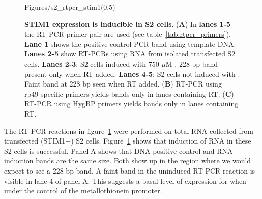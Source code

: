 \begin{figure}[ht!]
\begin{center}\vspace{-110pt}
	\begin{lpic}[clean]{Figures/s2_rtpcr_stim1(0.5)}
		
	\end{lpic}\vspace{100pt}
	\caption[STIM1 expression is inducible in \droso{} S2 cells]{{\bfseries STIM1 expression is inducible in \droso{} S2 cells}.
	({\bfseries A}) In {\bfseries lanes 1-5} the \stim{} RT-PCR primer pair are used (see table~\ref{tab:rtpcr_primers}).
	{\bfseries Lane 1} shows the positive control PCR band using \stim{} template DNA.
	{\bfseries Lanes 2-5} show RT-PCRs using RNA from isolated \stimivector{} transfected S2 cells. 
	{\bfseries Lanes 2-3}: S2 cells induced with 750 $\mu$M \cuso. 228 bp band present only when RT added.
	{\bfseries Lanes 4-5}: S2 cells not induced with \cuso. Faint band at 228 bp seen when RT added.
	({\bfseries B}) RT-PCR using rp49-specific primers yields bands only in lanes containing RT.
	({\bfseries C}) RT-PCR using HygBP primers yields bands only in lanes containing RT.
	\label{fig:stim1_rtpcr}}
\end{center}
\end{figure}

The RT-PCR reactions in figure~\ref{fig:stim1_rtpcr} were performed on total RNA collected from \stimivector{}-transfected (STIM1+) S2 cells. Figure~\ref{fig:stim1_rtpcr} shows that induction of \stim{} RNA in these S2 cells is successful. Panel A shows that DNA positive control and RNA induction bands are the same size. Both show up in the region where we would expect to see a 228 bp band. A faint band in the uninduced \stim{} RT-PCR reaction is visible in lane 4 of panel A. %
This suggests a basal level of expression for \stim{} when under the control of the metallothionein promoter.

